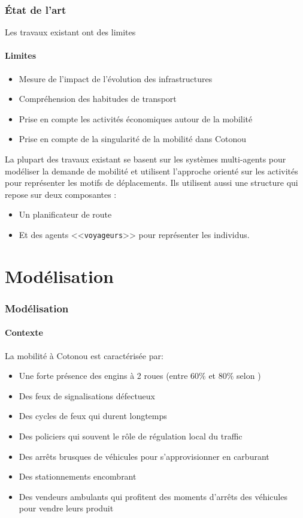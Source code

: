 \begin{frame}
    \frametitle{État de l'art}
    Les travaux existant ont des limites
    \framesubtitle{Limites}
    \begin{itemize}
        \item {} Mesure de l'impact de l'évolution des infrastructures
        \item {} Compréhension des habitudes de transport
        \item {} Prise en compte les activités économiques autour de la mobilité
        \item {} Prise en compte de la singularité de la mobilité dans Cotonou
    \end{itemize}
    \pause{}
    La plupart des travaux existant se basent sur les systèmes multi-agents pour modéliser la demande de mobilité et
    utilisent l'approche orienté sur les activités pour représenter les motifs de déplacements.
    Ils utilisent aussi une structure qui repose sur deux composantes :
    \begin{itemize}
        \item Un planificateur de route
        \item Et des agents <<\texttt{voyageurs}>> pour représenter les individus.
    \end{itemize}
\end{frame}


\section{Modélisation}\label{modelisation}

\begin{frame}
    \frametitle{Modélisation}
    \framesubtitle{Contexte}
    La mobilité à Cotonou est caractérisée par:
    \begin{itemize}
        \item Une forte présence des engins à 2 roues (entre $60\%$ et $80\%$ selon \textcite{briod2011zemidjan})
        \item Des feux de signalisations défectueux
        \item Des cycles de feux qui durent longtemps
        \item Des policiers qui souvent le rôle de régulation local du traffic
        \item Des arrêts brusques de véhicules pour s'approvisionner en carburant
        \item Des stationnements encombrant
        \item Des vendeurs ambulants qui profitent des moments d'arrêts des véhicules pour vendre leurs produit
    \end{itemize}

\end{frame}

